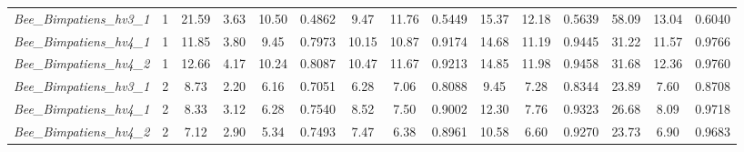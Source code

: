 \documentclass[11pt]{article}
\begin{document}
\begin{table}[H]
{\begin{tabular}{ccccccccccccccc}
      \textit{Bee\_Bimpatiens\_hv3\_1}&1&21.59  &3.63 &10.50&0.4862  &9.47 &11.76&0.5449  &15.37&12.18&0.5639  &58.09&13.04&0.6040\\
      \textit{Bee\_Bimpatiens\_hv4\_1}&1&11.85  &3.80 &9.45 &0.7973  &10.15&10.87&0.9174  &14.68&11.19&0.9445  &31.22&11.57&0.9766\\
      \textit{Bee\_Bimpatiens\_hv4\_2}&1&12.66  &4.17 &10.24&0.8087  &10.47&11.67&0.9213  &14.85&11.98&0.9458  &31.68&12.36&0.9760\\

      \textit{Bee\_Bimpatiens\_hv3\_1}&2&8.73   &2.20 &6.16 &0.7051  &6.28 &7.06 &0.8088  &9.45 &7.28 &0.8344  &23.89&7.60 &0.8708\\
      \textit{Bee\_Bimpatiens\_hv4\_1}&2&8.33   &3.12 &6.28 &0.7540  &8.52 &7.50 &0.9002  &12.30&7.76 &0.9323  &26.68&8.09 &0.9718\\
      \textit{Bee\_Bimpatiens\_hv4\_2}&2&7.12   &2.90 &5.34 &0.7493  &7.47 &6.38 &0.8961  &10.58&6.60 &0.9270  &23.73&6.90 &0.9683\\          
      \hline
      \end{tabular}%
      }
      \end{table}




\end{document}
